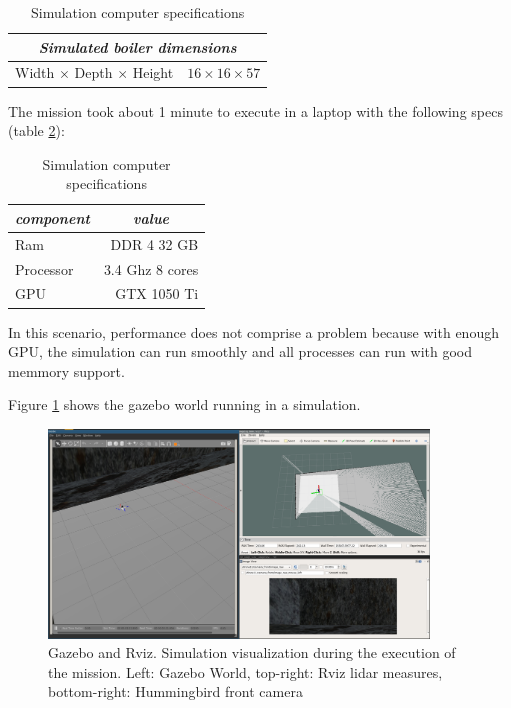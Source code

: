    \begin{table}[!h]
      \centering
      \begin{tabular}{lr} \toprule
        \multicolumn{2}{c}{\textit{Simulated boiler dimensions}}        \\ \midrule
        Width $\times$ Depth $\times$ Height & $16 \times 16 \times 57$ \\ \bottomrule
        \hline
      \end{tabular}
      \caption{Simulation computer specifications}
      \label{ch_5:table:boiler_sim_dims}
    \end{table}

    The mission took about 1 minute to execute in a laptop with the following specs (table \ref{ch_5:table:laptop_specs}):

    \begin{table}[!h]
      \centering
      \begin{tabular}{lr} \toprule
        \multicolumn{1}{c}{\textit{component}} & \multicolumn{1}{c}{\textit{value}}   \\ \midrule
        Ram           & DDR 4 32 GB     \\
        Processor     & 3.4 Ghz 8 cores \\
        GPU           & GTX 1050 Ti     \\ \bottomrule
        \hline
      \end{tabular}
      \caption{Simulation computer specifications}
      \label{ch_5:table:laptop_specs}
    \end{table}

    In this scenario, performance does not comprise a problem because with enough GPU, the simulation can run smoothly and all processes can run with good memmory support. 

    Figure \ref{ch_5:fig:full_sim} shows the gazebo world running in a simulation.
    
    \begin{figure}
      \centering
      \includegraphics[width=0.9\textwidth,height=0.5\textheight,keepaspectratio]{./Figures/FullSim.png}
      \caption{Gazebo and Rviz. Simulation visualization during the execution of the mission. Left: Gazebo World, top-right: Rviz lidar measures, bottom-right: Hummingbird front camera}
      \label{ch_5:fig:full_sim}
    \end{figure}


